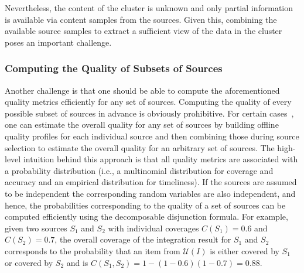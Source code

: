 \documentclass{sig-alternate}
\begin{document}
\vspace{3pt} Nevertheless, the content of the cluster is unknown and only partial information is available via content samples from the sources. Given this,  combining the available source samples to extract a sufficient view of the data in the cluster poses an important challenge. 


\subsubsection{Computing the Quality of Subsets of Sources} 
Another challenge is that one should be able to compute the aforementioned quality metrics efficiently for any set of sources. Computing the quality of every possible subset of sources in advance is obviously prohibitive. For certain cases~\cite{dong:vldb13,rekatsinas:2014}, one can estimate the overall quality for any set of sources by building offline quality profiles for each individual source and then combining those during source selection to estimate the overall quality for an arbitrary set of sources. The high-level intuition behind this approach is that all quality metrics are associated with a probability distribution (i.e., a multinomial distribution for coverage and accuracy and an empirical distribution for timeliness). If the sources are assumed to be independent the corresponding random variables are also independent, and hence, the probabilities corresponding to the quality of a set of sources can be computed efficiently using the decomposable disjunction formula. For example, given two sources $S_1$ and $S_2$ with individual coverages $C(S_1) = 0.6$ and $C(S_2) = 0.7$, the overall coverage of the integration result for $S_1$ and $S_2$ corresponds to the probability that an item from $\mathcal{U}(I)$ is either covered by $S_1$ or covered by $S_2$ and is $C(S_1,S_2) = 1 - (1-0.6)(1-0.7) = 0.88$.
\end{document}
